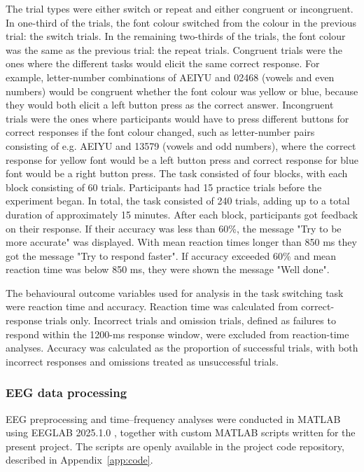 \documentclass[12pt,a4paper]{report}
\begin{document}
The trial types were either switch or repeat and either congruent or incongruent. In one-third of the trials, the font colour switched from the colour in the previous trial: the switch trials. In the remaining two-thirds of the trials, the font colour was the same as the previous trial: the repeat trials. Congruent trials were the ones where the different tasks would elicit the same correct response. For example, letter-number combinations of AEIYU and 02468 (vowels and even numbers) would be congruent whether the font colour was yellow or blue, because they would both elicit a left button press as the correct answer. Incongruent trials were the ones where participants would have to press different buttons for correct responses if the font colour changed, such as letter-number pairs consisting of e.g. AEIYU and 13579 (vowels and odd numbers), where the correct response for yellow font would be a left button press and correct response for blue font would be a right button press.
The task consisted of four blocks, with each block consisting of 60 trials. Participants had 15 practice trials before the experiment began. In total, the task consisted of 240 trials, adding up to a total duration of approximately 15 minutes. After each block, participants got feedback on their response. If their accuracy was less than 60\%, the message "Try to be more accurate" was displayed. With mean reaction times longer than 850 ms they got the message "Try to respond faster". If accuracy exceeded 60\% and mean reaction time was below 850 ms, they were shown the message "Well done". 

The behavioural outcome variables used for analysis in the task switching task were reaction time and accuracy. Reaction time was calculated from correct-response trials only. Incorrect trials and omission trials, defined as failures to respond within the 1200-ms response window, were excluded from reaction-time analyses. Accuracy was calculated as the proportion of successful trials, with both incorrect responses and omissions treated as unsuccessful trials.


\subsubsection{EEG data processing}

EEG preprocessing and time--frequency analyses were conducted in MATLAB using EEGLAB 2025.1.0 \parencite{delorme2004eeglab}, together with custom MATLAB scripts written for the present project. The scripts are openly available in the project code repository, described in Appendix~\ref{app:code}. 
\end{document}
